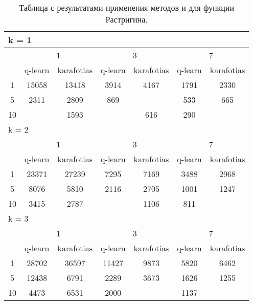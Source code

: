 \begin{table}
  \centering
  \begin{tabular}{|*7{c|}}
    \hline
    \multicolumn{7}{|l|}{k = 1} \\
    \hline
    \multirow{2}{*}{\diagbox{$\mu$}{$\lambda$}} & \multicolumn{2}{c|}{1} & \multicolumn{2}{c|}{3} & \multicolumn{2}{c|}{7} \\
    \cline{2-7}
    & q-learn & karafotias & q-learn & karafotias & q-learn & karafotias \\
    \hline
    1 & 15058 & 13418 & 3914 & 4167 & 1791 & 2330 \\
    \hline
    5 & 2311 & 2809 & 869& \cellcolor{olive}{748} & 533 & 665 \\
    \hline
    10 & \cellcolor{olive}{1497} & 1593& \cellcolor{olive}{488} & 616 & 290& \cellcolor{olive}{235} \\
    \hline
    \multicolumn{7}{|l|}{k = 2} \\
    \hline
    \multirow{2}{*}{\diagbox{$\mu$}{$\lambda$}} & \multicolumn{2}{c|}{1} & \multicolumn{2}{c|}{3} & \multicolumn{2}{c|}{7} \\
    \cline{2-7}
    & q-learn & karafotias & q-learn & karafotias & q-learn & karafotias \\
    \hline
    1 & 23371 & 27239 & 7295 & 7169 & 3488 & 2968 \\
    \hline
    5 & 8076 & 5810 & 2116 & 2705 & 1001 & 1247 \\
    \hline
    10 & 3415 & 2787& \cellcolor{olive}{1037} & 1106 & 811& \cellcolor{olive}{666} \\
    \hline
    \multicolumn{7}{|l|}{k = 3} \\
    \hline
    \multirow{2}{*}{\diagbox{$\mu$}{$\lambda$}} & \multicolumn{2}{c|}{1} & \multicolumn{2}{c|}{3} & \multicolumn{2}{c|}{7} \\
    \cline{2-7}
    & q-learn & karafotias & q-learn & karafotias & q-learn & karafotias \\
    \hline
    1 & 28702 & 36597 & 11427 & 9873 & 5820 & 6462 \\
    \hline
    5 & 12438 & 6791 & 2289 & 3673 & 1626 & 1255 \\
    \hline
    10 & 4473 & 6531 & 2000 & \cellcolor{olive}{1650} & 1137 & \cellcolor{olive}{1098} \\
    \hline
  \end{tabular}
  \captionsetup{justification=centering}
  \caption{Таблица с результатами применения методов  и  для функции Растригина.}
  \label{q_rastrigin_results}
\end{table}


